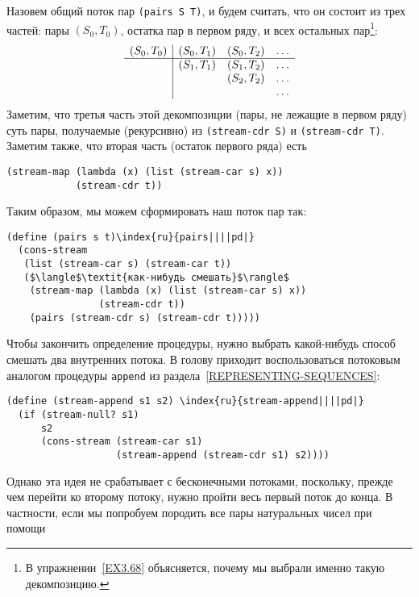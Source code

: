 Назовем общий поток пар {\tt (pairs S T)}, и будем
считать, что он состоит из трех частей: пары $(S_0, T_0)$,
остатка пар в первом ряду, и всех остальных пар\footnote{В упражнении~\ref{EX3.68} объясняется,
почему мы выбрали именно такую декомпозицию.}:
$$
\begin{array}{c|ccc}
(S_0, T_0) & (S_0, T_1) & (S_0, T_2) & \ldots\\
\hline
           & (S_1, T_1) & (S_1, T_2) & \ldots\\
           &            & (S_2, T_2) & \ldots\\
           &            &            & \ldots\\
\end{array}
$$
Заметим, что третья часть этой декомпозиции (пары, не лежащие в первом
ряду) суть пары, получаемые (рекурсивно) из {\tt (stream-cdr
S)} и {\tt (stream-cdr T)}.  Заметим также, что вторая
часть (остаток первого ряда) есть

\begin{Verbatim}[fontsize=\small]
(stream-map (lambda (x) (list (stream-car s) x))
            (stream-cdr t))
\end{Verbatim}
Таким образом, мы можем сформировать наш поток пар так:

\begin{Verbatim}[fontsize=\small]
(define (pairs s t)\index{ru}{pairs||||pd|}
  (cons-stream
   (list (stream-car s) (stream-car t))
   ($\langle$\textit{как-нибудь смешать}$\rangle$
    (stream-map (lambda (x) (list (stream-car s) x))
                (stream-cdr t))
    (pairs (stream-cdr s) (stream-cdr t)))))
\end{Verbatim}

Чтобы закончить определение процедуры, нужно выбрать
какой-нибудь способ смешать два внутренних потока.  В голову приходит
воспользоваться потоковым аналогом процедуры {\tt append}
из раздела~\ref{REPRESENTING-SEQUENCES}:

\begin{Verbatim}[fontsize=\small]
(define (stream-append s1 s2) \index{ru}{stream-append||||pd|}
  (if (stream-null? s1)
      s2
      (cons-stream (stream-car s1)
                   (stream-append (stream-cdr s1) s2))))
\end{Verbatim}
Однако эта идея не срабатывает с бесконечными потоками, поскольку,
прежде чем перейти ко второму потоку, нужно пройти весь первый поток
до конца.  В частности, если мы попробуем породить все пары натуральных
чисел при помощи

